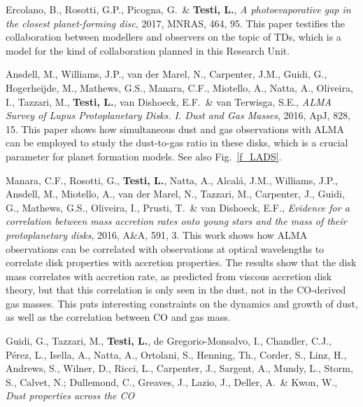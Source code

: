 \documentclass[10pt,fleqn,twoside]{article}
\begin{document}

\begin{literature}
\item Ercolano, B., Rosotti, G.P., Picogna, G.\ \& {\bf Testi, L.}, {\em A
    photoevaporative gap in the closest planet-forming disc}, 2017, MNRAS,
  464, 95. This paper testifies the collaboration between modellers and
  observers on the topic of TDs, which is a model for the kind of
  collaboration planned in this Research Unit.
\item Ansdell, M., Williams, J.P., van der Marel, N., Carpenter, J.M.,
  Guidi, G., Hogerheijde, M., Mathews, G.S., Manara, C.F., Miotello, A.,
  Natta, A., Oliveira, I., Tazzari, M., {\bf Testi, L.}, van Dishoeck, E.F.\
  \& van Terwisga, S.E., {\em ALMA Survey of Lupus Protoplanetary
    Disks. I. Dust and Gas Masses}, 2016, ApJ, 828, 15. This paper shows how
  simultaneous dust and gas observations with ALMA can be employed to study
  the dust-to-gas ratio in these disks, which is a crucial parameter for
  planet formation models. See also Fig.~\ref{f_LADS}.
\item Manara, C.F., Rosotti, G., {\bf Testi, L.}, Natta, A., Alcalá, J.M.,
  Williams, J.P., Ansdell, M., Miotello, A., van der Marel, N., Tazzari, M.,
  Carpenter, J., Guidi, G., Mathews, G.S., Oliveira, I., Prusti, T.\ \& van
  Dishoeck, E.F., {\em Evidence for a correlation between mass accretion
    rates onto young stars and the mass of their protoplanetary disks},
  2016, A\&A, 591, 3. This work shows how ALMA observations can be
  correlated with observations at optical wavelengths to correlate disk
  properties with accretion properties. The results show that the disk mass
  correlates with accretion rate, as predicted from viscous accretion disk
  theory, but that this correlation is only seen in the dust, not in the
  CO-derived gas masses.  This puts interesting constraints on the dynamics
  and growth of dust, as well as the correlation between CO and gas mass.
\item Guidi, G., Tazzari, M., {\bf Testi, L.}, de Gregorio-Monsalvo, I.,
  Chandler, C.J., Pérez, L., Isella, A., Natta, A., Ortolani, S., Henning,
  Th., Corder, S., Linz, H., Andrews, S., Wilner, D., Ricci, L., Carpenter,
  J., Sargent, A., Mundy, L., Storm, S., Calvet, N.; Dullemond, C., Greaves,
  J., Lazio, J., Deller, A.\ \& Kwon, W., {\em Dust properties across the CO
}
\end{literature}
\end{document}
